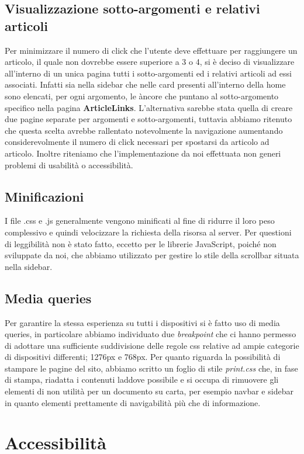 \documentclass[12pt]{article}
\begin{document}
	\subsection{Visualizzazione sotto-argomenti e relativi articoli}
	Per minimizzare il numero di click che l'utente deve effettuare per raggiungere un articolo, il quale non dovrebbe essere superiore a 3 o 4, si è deciso di visualizzare all'interno di un unica pagina tutti i sotto-argomenti ed i relativi articoli ad essi associati. Infatti sia nella sidebar che nelle card presenti all'interno della home sono elencati, per ogni argomento, le àncore che puntano al sotto-argomento specifico nella pagina \textbf{ArticleLinks}. L'alternativa sarebbe stata quella di creare due pagine separate per argomenti e sotto-argomenti, tuttavia abbiamo ritenuto che questa scelta avrebbe rallentato notevolmente la navigazione aumentando considerevolmente il numero di click necessari per spostarsi da articolo ad articolo. Inoltre riteniamo che l'implementazione da noi effettuata non generi problemi di usabilità o accessibilità.

	\subsection{Minificazioni}
	I file .css e .js generalmente vengono minificati al fine di ridurre il loro peso complessivo e quindi velocizzare la richiesta della risorsa al server. Per questioni di leggibilità non è stato fatto, eccetto per le librerie JavaScript, poiché non sviluppate da noi, che abbiamo utilizzato per gestire lo stile della scrollbar situata nella sidebar.
	
	\subsection{Media queries}
	Per garantire la stessa esperienza su tutti i dispositivi si è fatto uso di media queries, in particolare abbiamo individuato due \emph{breakpoint} che ci hanno permesso di adottare una sufficiente suddivisione delle regole css relative ad ampie categorie di dispositivi differenti; 1276px e 768px.
	Per quanto riguarda la possibilità di stampare le pagine del sito, abbiamo scritto un foglio di stile \emph{print.css} che, in fase di stampa, riadatta i contenuti laddove possibile e si occupa di rimuovere gli elementi di non utilità per un documento su carta, per esempio navbar e sidebar in quanto elementi prettamente di navigabilità più che di informazione.

	\section{Accessibilità}
\end{document}

